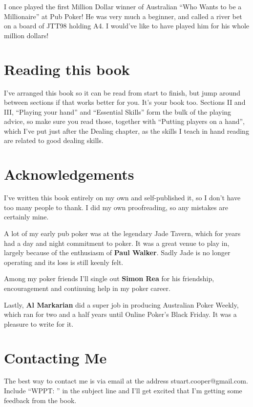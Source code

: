 I once played the first Million Dollar winner of Australian ``Who Wants to
be a Millionaire'' at Pub Poker! He was very much a beginner, and called
a river bet on a board of JTT98 holding A4. I would've like to have played
him for his whole million dollars!

\section*{Reading this book}

I've arranged this book so it can be read from start to finish, but jump
around between sections if that works better for you. It's your book too.
Sections II and III, ``Playing your hand'' and ``Essential Skills'' form
the bulk of the playing advice, so make sure you read those, together
with ``Putting players on a hand'', which I've put just after the
Dealing chapter, as the skills I teach in hand reading are related
to good dealing skills.

\section*{Acknowledgements}

I've written this book entirely on my own and self-published it, so I don't
have too many people to thank. I did my own proofreading, so any mistakes
are certainly mine.

A lot of my early pub poker was at the legendary Jade Tavern,
which for years had a day and night commitment to poker.
It was a great venue to play in, largely because of the enthusiasm
of \textbf{Paul Walker}. Sadly Jade is no longer operating and
its loss is still keenly felt.

Among my poker friends I'll single out \textbf{Simon Rea} for his friendship,
encouragement and continuing help in my poker career.

Lastly, \textbf{Al Markarian} did a super job in producing Australian
Poker Weekly, which ran for two and a half years until Online Poker's
Black Friday. It was a pleasure to write for it.

\section*{Contacting Me}

The best way to contact me is via email at the address
stuart.cooper@gmail.com. Include ``WPPT: '' in the subject
line and I'll get excited that I'm getting some feedback from
the book.

